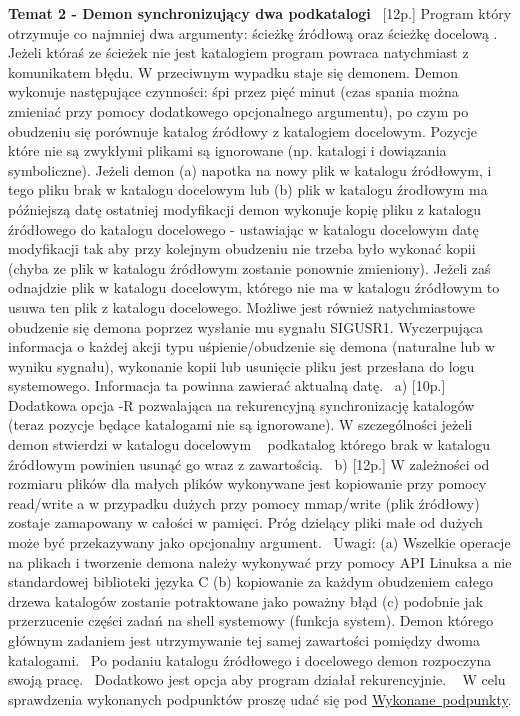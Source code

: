 {\bfseries{Temat 2 -\/ Demon synchronizujący dwa podkatalogi}}~\newline
 \mbox{[}12p.\mbox{]} Program który otrzymuje co najmniej dwa argumenty\+: ścieżkę źródłową oraz ścieżkę docelową . Jeżeli któraś ze ścieżek nie jest katalogiem program powraca natychmiast z komunikatem błędu. W przeciwnym wypadku staje się demonem. Demon wykonuje następujące czynności\+: śpi przez pięć minut (czas spania można zmieniać przy pomocy dodatkowego opcjonalnego argumentu), po czym po obudzeniu się porównuje katalog źródłowy z katalogiem docelowym. Pozycje które nie są zwykłymi plikami są ignorowane (np. katalogi i dowiązania symboliczne). Jeżeli demon (a) napotka na nowy plik w katalogu źródłowym, i tego pliku brak w katalogu docelowym lub (b) plik w katalogu źrodłowym ma późniejszą datę ostatniej modyfikacji demon wykonuje kopię pliku z katalogu źródłowego do katalogu docelowego -\/ ustawiając w katalogu docelowym datę modyfikacji tak aby przy kolejnym obudzeniu nie trzeba było wykonać kopii (chyba ze plik w katalogu źródłowym zostanie ponownie zmieniony). Jeżeli zaś odnajdzie plik w katalogu docelowym, którego nie ma w katalogu źródłowym to usuwa ten plik z katalogu docelowego. Możliwe jest również natychmiastowe obudzenie się demona poprzez wysłanie mu sygnału SIGUSR1. Wyczerpująca informacja o każdej akcji typu uśpienie/obudzenie się demona (naturalne lub w wyniku sygnału), wykonanie kopii lub usunięcie pliku jest przesłana do logu systemowego. Informacja ta powinna zawierać aktualną datę.~\newline
 a) \mbox{[}10p.\mbox{]} Dodatkowa opcja -\/R pozwalająca na rekurencyjną synchronizację katalogów (teraz pozycje będące katalogami nie są ignorowane). W szczególności jeżeli demon stwierdzi w katalogu docelowym ~\newline
 podkatalog którego brak w katalogu źródłowym powinien usunąć go wraz z zawartością.~\newline
 b) \mbox{[}12p.\mbox{]} W zależności od rozmiaru plików dla małych plików wykonywane jest kopiowanie przy pomocy read/write a w przypadku dużych przy pomocy mmap/write (plik źródłowy) zostaje zamapowany w całości w pamięci. Próg dzielący pliki małe od dużych może być przekazywany jako opcjonalny argument.~\newline
 Uwagi\+: (a) Wszelkie operacje na plikach i tworzenie demona należy wykonywać przy pomocy API Linuksa a nie standardowej biblioteki języka C (b) kopiowanie za każdym obudzeniem całego drzewa katalogów zostanie potraktowane jako poważny błąd (c) podobnie jak przerzucenie części zadań na shell systemowy (funkcja system). Demon którego głównym zadaniem jest utrzymywanie tej samej zawartości pomiędzy dwoma katalogami.~\newline
 Po podaniu katalogu źródłowego i docelowego demon rozpoczyna swoją pracę.~\newline
 Dodatkowo jest opcja aby program działał rekurencyjnie. ~\newline
 W celu sprawdzenia wykonanych podpunktów proszę udać się pod \mbox{\hyperlink{page2}{Wykonane podpunkty}}. 